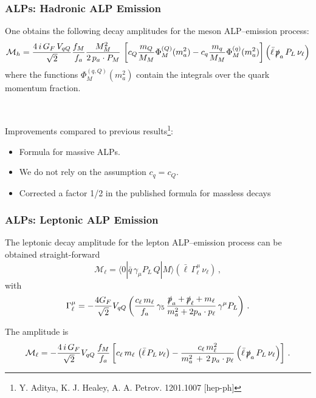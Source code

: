 \documentclass[mathserif, 10pt]{beamer}
\begin{document}
\begin{frame}\frametitle{ALPs: Hadronic ALP Emission}
    One obtains the following decay amplitudes for the meson ALP--emission process:
    {\small $$\mathcal{M}_{h} = \frac{4\,i\,G_F\,V_{qQ}}{\sqrt{2}} \frac{f_M}{f_a} \frac{M_M^2}{2\,p_a \cdot P_M} \,
        \left[ c_Q \frac{m_Q}{M_M} \Phi^{(Q)}_M(m_a^2) - c_q \frac{m_q}{M_M} \Phi^{(q)}_M (m_a^2) \right]
        \left(\bar{\ell} \, \slashed{p}_a \,P_L \, \nu_\ell \right)$$}
    where the functions $\Phi^{(q,Q)}_M (m_a^2)$ contain the integrals over the quark momentum fraction.

    ~

    Improvements compared to previous results\footnote[19]{Y. Aditya, K. J. Healey, A. A. Petrov. 1201.1007 [hep-ph]}:
    \begin{itemize}
        \item Formula for massive ALPs.
        \item We do not rely on the assumption $c_q = c_Q$.
        \item Corrected a factor 1/2 in the published formula for massless decays
    \end{itemize}

\end{frame}

\begin{frame}\frametitle{ALPs: Leptonic ALP Emission}
    The leptonic decay amplitude for the lepton ALP--emission process can be obtained straight-forward
    $$ \mathcal{M}_\ell =  \langle 0|\bar{q}\,\gamma_\mu  P_L\,Q |M\rangle \left(\bar{\ell} \,\Gamma^\mu_\ell \,\nu_\ell \right) \,,
    $$
    with
    $$
        \Gamma^\mu_\ell = - \frac{4 G_F}{\sqrt{2}} V_{qQ}
        \left(\frac{c_\ell\,m_\ell}{f_a}\,\gamma_5\,\frac{\slashed{p}_a+\slashed{p}_\ell+m_\ell}{m_a^2 + 2 p_a \cdot p_\ell}\,\gamma^\mu P_L \right)\,.$$

    The amplitude is
    $$\mathcal{M}_\ell = - \frac{4\,i\, G_F}{\sqrt{2}} V_{qQ} \,\frac{f_M}{f_a}  \left[  c_\ell\,m_\ell\, \left(\bar{\ell} \, P_L \,\nu_\ell \right) -
            \frac{ c_\ell \, m^2_\ell}{m_a^2\,+\, 2\,p_a\cdot p_\ell} \left(\bar{\ell} \, \slashed{p}_a\, P_L \,\nu_\ell \right) \right] \,.$$
\end{frame}
\end{document}
